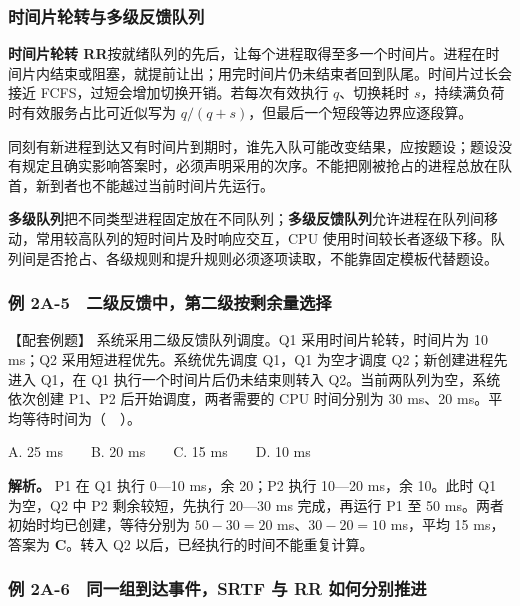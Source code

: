 \subsubsection{时间片轮转与多级反馈队列}\label{OS02-auto-3}

\textbf{时间片轮转 RR}按就绪队列的先后，让每个进程取得至多一个时间片。进程在时间片内结束或阻塞，就提前让出；用完时间片仍未结束者回到队尾。时间片过长会接近 FCFS，过短会增加切换开销。若每次有效执行 \(q\)、切换耗时 \(s\)，持续满负荷时有效服务占比可近似写为 \(q/(q+s)\)，但最后一个短段等边界应逐段算。

同刻有新进程到达又有时间片到期时，谁先入队可能改变结果，应按题设；题设没有规定且确实影响答案时，必须声明采用的次序。不能把刚被抢占的进程总放在队首，新到者也不能越过当前时间片先运行。

\textbf{多级队列}把不同类型进程固定放在不同队列；\textbf{多级反馈队列}允许进程在队列间移动，常用较高队列的短时间片及时响应交互，CPU 使用时间较长者逐级下移。队列间是否抢占、各级规则和提升规则必须逐项读取，不能靠固定模板代替题设。

\subsubsection{例 2A-5　二级反馈中，第二级按剩余量选择}\label{OS02-ex2-5}

\begin{example}[配套例题]

【配套例题】 系统采用二级反馈队列调度。Q1 采用时间片轮转，时间片为 10 ms；Q2 采用短进程优先。系统优先调度 Q1，Q1 为空才调度 Q2；新创建进程先进入 Q1，在 Q1 执行一个时间片后仍未结束则转入 Q2。当前两队列为空，系统依次创建 P1、P2 后开始调度，两者需要的 CPU 时间分别为 30 ms、20 ms。平均等待时间为（　）。

A. 25 ms　　B. 20 ms　　C. 15 ms　　D. 10 ms

\end{example}

\textbf{解析。} P1 在 Q1 执行 0---10 ms，余 20；P2 执行 10---20 ms，余 10。此时 Q1 为空，Q2 中 P2 剩余较短，先执行 20---30 ms 完成，再运行 P1 至 50 ms。两者初始时均已创建，等待分别为 \(50-30=20\) ms、\(30-20=10\) ms，平均 15 ms，答案为 \textbf{C}。转入 Q2 以后，已经执行的时间不能重复计算。

\subsubsection{例 2A-6　同一组到达事件，SRTF 与 RR 如何分别推进}\label{OS02-ex2-6}

